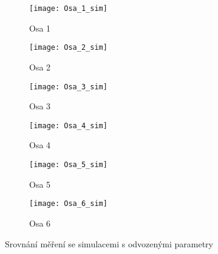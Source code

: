\clearpage

\begin{figure}[h]
    \centering
    \begin{subfigure}[b]{0.49\textwidth}
        \texttt{[image: Osa\_1\_sim]}
        \caption{Osa 1}
        \label{osa_1_sim_pic}
    \end{subfigure}
    \begin{subfigure}[b]{0.49\textwidth}
        \texttt{[image: Osa\_2\_sim]}
        \caption{Osa 2}
        \label{osa_2_sim_pic}
    \end{subfigure}
    \begin{subfigure}[b]{0.49\textwidth}
        \texttt{[image: Osa\_3\_sim]}
        \caption{Osa 3}
        \label{osa_3_sim_pic}
    \end{subfigure}
    \begin{subfigure}[b]{0.49\textwidth}
        \texttt{[image: Osa\_4\_sim]}
        \caption{Osa 4}
        \label{osa_4_sim_pic}
    \end{subfigure}
    \begin{subfigure}[b]{0.49\textwidth}
        \texttt{[image: Osa\_5\_sim]}
        \caption{Osa 5}
        \label{osa_5_sim_pic}
    \end{subfigure}
    \begin{subfigure}[b]{0.49\textwidth}
        \texttt{[image: Osa\_6\_sim]}
        \caption{Osa 6}
        \label{osa_6_sim_pic}
    \end{subfigure}
    \caption{Srovnání měření se simulacemi s odvozenými parametry}\label{osy_sim_pic}
\end{figure}